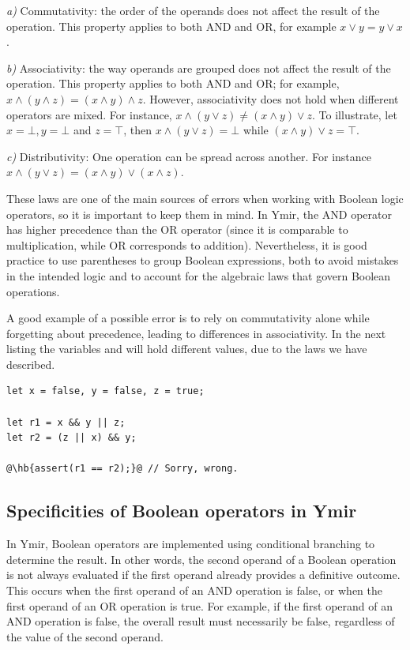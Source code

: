 \textit{a)} Commutativity: the order of the operands does not affect the result of the
operation. This property applies to both AND and OR, for example $x \lor y =
y \lor x$.
\smallskip

\textit{b)} Associativity: the way operands are grouped does not affect the result of the
operation. This property applies to both AND and OR; for example, $x \land
(y \land z) = (x \land y) \land z$. However, associativity does not hold when
different operators are mixed. For instance, $x \land (y \lor z) \neq (x \land
y) \lor z$. To illustrate, let $x = \bot, y = \bot$ and $z = \top$, then
$x \land (y \lor z) = \bot$ while $(x \land y) \lor z = \top$.
\smallskip

\textit{c)} Distributivity: One operation can be spread across another. For instance
$x \land (y \lor z) = (x \land y) \lor (x \land z)$.

These laws are one of the main sources of errors when working with Boolean logic
operators, so it is important to keep them in mind. In Ymir, the AND operator
has higher precedence than the OR operator (since it is comparable to
multiplication, while OR corresponds to addition). Nevertheless, it is good
practice to use parentheses to group Boolean expressions, both to avoid mistakes
in the intended logic and to account for the algebraic laws that govern Boolean
operations.

A good example of a possible error is to rely on commutativity alone while forgetting about precedence, leading to differences in associativity. In the next listing the variables  and  will hold different values, due to the laws we have described.

\begin{lstlisting}[style=coloredverbatim, label=lst:(chap2):boolean_error, caption=Example of logic error when dealing with Boolean values, escapechar=@]
let x = false, y = false, z = true;

let r1 = x && y || z;
let r2 = (z || x) && y;

@\hb{assert(r1 == r2);}@ // Sorry, wrong. 
\end{lstlisting}

\subsection{Specificities of Boolean operators in Ymir}

In Ymir, Boolean operators are implemented using conditional branching to
determine the result. In other words, the second operand of a Boolean operation
is not always evaluated if the first operand already provides a definitive
outcome. This occurs when the first operand of an AND operation is false, or
when the first operand of an OR operation is true. For example, if the first
operand of an AND operation is false, the overall result must necessarily be
false, regardless of the value of the second operand.

